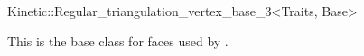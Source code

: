 

\begin{ccRefClass}{Kinetic::Regular_triangulation_vertex_base_3<Traits, Base>}  %


\ccDefinition
  
This is the base class for faces used by .



\end{ccRefClass}



